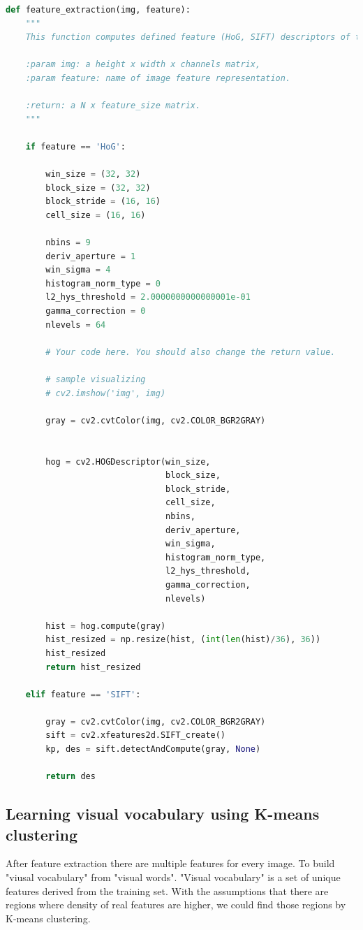 \begin{lstlisting}[language=Python]
def feature_extraction(img, feature):
    """
    This function computes defined feature (HoG, SIFT) descriptors of the target image.

    :param img: a height x width x channels matrix,
    :param feature: name of image feature representation.

    :return: a N x feature_size matrix.
    """

    if feature == 'HoG':

        win_size = (32, 32)
        block_size = (32, 32)
        block_stride = (16, 16)
        cell_size = (16, 16)

        nbins = 9
        deriv_aperture = 1
        win_sigma = 4
        histogram_norm_type = 0
        l2_hys_threshold = 2.0000000000000001e-01
        gamma_correction = 0
        nlevels = 64

        # Your code here. You should also change the return value.

        # sample visualizing
        # cv2.imshow('img', img)

        gray = cv2.cvtColor(img, cv2.COLOR_BGR2GRAY)


        hog = cv2.HOGDescriptor(win_size,
                                block_size,
                                block_stride,
                                cell_size,
                                nbins,
                                deriv_aperture,
                                win_sigma,
                                histogram_norm_type,
                                l2_hys_threshold,
                                gamma_correction,
                                nlevels)

        hist = hog.compute(gray)
        hist_resized = np.resize(hist, (int(len(hist)/36), 36))
        hist_resized
        return hist_resized

    elif feature == 'SIFT':

        gray = cv2.cvtColor(img, cv2.COLOR_BGR2GRAY)
        sift = cv2.xfeatures2d.SIFT_create()
        kp, des = sift.detectAndCompute(gray, None)

        return des

\end{lstlisting}

    \subsection*{Learning visual vocabulary using K-means clustering}
After feature extraction there are multiple features for every image. To build "viusal vocabulary" from "visual words". "Visual vocabulary" is a set of unique features derived from the training set. With the assumptions that there are regions where density of real features are higher, we could find those regions by K-means clustering.

